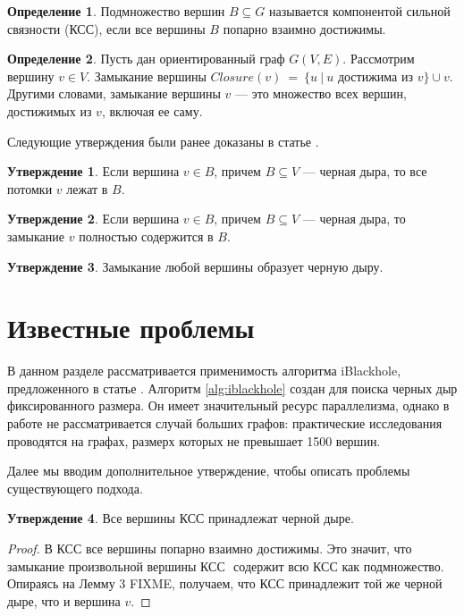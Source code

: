 \documentclass[12pt,a4paper,oneside]{article}
\theoremstyle{definition}
\newtheorem{definition}{Определение}[]
\theoremstyle{lemma}
\newtheorem{lemma}{Утверждение}[]
\theoremstyle{remark}
\begin{document}
\begin{definition}\label{def:scc}
Подмножество вершин $B \subseteq G$ называется компонентой сильной связности (КСС), если все вершины $B$ попарно взаимно достижимы.
\end{definition}

\begin{definition}\label{def:closure}
Пусть дан ориентированный граф $G(V,E)$. Рассмотрим вершину $v \in V$. Замыкание вершины $Closure(v)\ =\ \{u\ |\ u$ достижима из $v\} \cup {v}$.
Другими словами, замыкание вершины $v$ --- это множество всех вершин, достижимых из $v$, включая ее саму.
\end{definition}

Следующие утверждения были ранее доказаны в статье \cite{li2010detecting}.

\begin{lemma}
Если вершина $v \in B$, причем $B \subseteq V$ --- черная дыра, то все потомки $v$ лежат в $B$.
\end{lemma}

\begin{lemma}
Если вершина $v \in B$, причем $B \subseteq V$ --- черная дыра, то замыкание $v$ полностью содержится в $B$.
\end{lemma}

\begin{lemma}
Замыкание любой вершины образует черную дыру.
\end{lemma}

\cleardoublepage
\section{Известные проблемы}\label{sec:knownissues}

В данном разделе рассматривается применимость алгоритма iBlackhole, предложенного в статье \cite{li2010detecting}. Алгоритм \ref{alg:iblackhole} создан для поиска черных дыр фиксированного размера. Он имеет значительный ресурс параллелизма, однако в работе \cite{li2010detecting} не рассматривается случай больших графов: практические исследования проводятся на графах, размерх которых не превышает 1500 вершин.

Далее мы вводим дополнительное утверждение, чтобы описать проблемы существующего подхода.

\begin{lemma}{}
Все вершины КСС принадлежат черной дыре.
\end{lemma}
\begin{proof}
В КСС все вершины попарно взаимно достижимы. Это значит, что замыкание произвольной вершины КСС $ $ содержит всю КСС как подмножество. Опираясь на Лемму 3 FIXME, получаем, что КСС принадлежит той же черной дыре, что и вершина $v$.
\end{proof}
\end{document}
